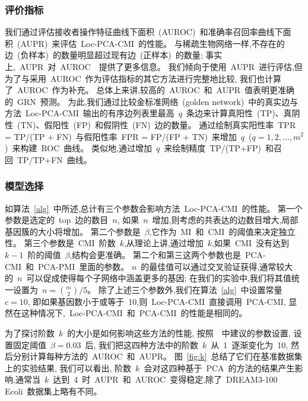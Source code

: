 \subsubsection{评价指标}

我们通过评估接收者操作特征曲线下面积~(AUROC)~和准确率召回率曲线下面积~(AUPR)~来评估~Loc-PCA-CMI~的性能。
与稀疏生物网络一样,不存在的边~(负样本)~的数量明显超过现有边~(正样本)~的数量; 
事实上,~AUPR~对~AUROC~\cite{saito2015precision}~提供了更多信息。
我们倾向于使用~AUPR~进行评估,但为了与采用~AUROC~作为评估指标的其它方法进行完整地比较,
我们也计算了~AUROC~作为补充。
总体上来讲,较高的~AUROC~和~AUPR~值表明更准确的~GRN~预测。
为此,我们通过比较金标准网络~(golden network)~中的真实边与
方法~Loc-PCA-CMI~输出的有序边列表里最高~$q$~条边来计算真阳性~(TP)、真阴性~(TN)、假阳性~(FP)~和假阴性~(FN)~边的数量。
通过绘制真实阳性率~TPR = TP/(TP + FN)~与假阳性率~FPR = FP/(FP + TN)~来增加~$q$~($q = 1, 2, \ldots, m^2$)~来构建~ROC~曲线。
类似地,通过增加~$q$~来绘制精度~TP/(TP+FP)~和召回~TP/TP+FN~曲线。


\subsubsection{模型选择}
如算法~\ref{alg}~中所述,总计有三个参数会影响方法~Loc-PCA-CMI~的性能。
第一个参数是选定的~top~边的数目~$n$,
如果~$n$~增加,则考虑的共表达的边数目增大,局部基因簇的大小将增加。
第二个参数是~$\beta$,它作为~MI~和~CMI~的阈值来决定独立性。
第三个参数是~CMI~阶数~$k$,从理论上讲,通过增加~$k$,如果~CMI~没有达到~$k-1$~阶的阈值~$\beta$,结构会更准确。
第二个和第三这两个参数也是~PCA-CMI~和~PCA-PMI~里面的参数。
$n$~的最佳值可以通过交叉验证获得,通常较大的~$n$~可以促成使得每个子网络中涵盖更多的基因;
在我们的实验中,我们将其值统一设置为~$n =\binom{m} {2}/5$。
除了上述三个参数外,我们在算法~\ref{alg}~中设置常量~$c = 10$,
即如果基因数小于或等于~10,则~Loc-PCA-CMI~直接调用~PCA-CMI,
显然在这种情况下,~Loc-PCA-CMI~和~PCA-CMI~的性能是相同的。

为了探讨阶数~$k$~的大小是如何影响这些方法的性能,
按照~\cite{zhang2011inferring,zhao2016part}~中建议的参数设置,
设置固定阈值~$\beta = 0.03$~后,
我们把这四种方法中的阶数~$k$~从~1~逐渐变化为~10,
然后分别计算每种方法的~AUROC~和~AUPR。
图~\ref{fig:k}~总结了它们在基准数据集上的实验结果, 我们可以看出, 阶数~$k$~会对这四种基于~PCA~的方法的结果产生影响,通常当~$k$~达到~4~时~AUPR~和~AUROC~变得稳定,除了~DREAM3-100 Ecoli~数据集上略有不同。

